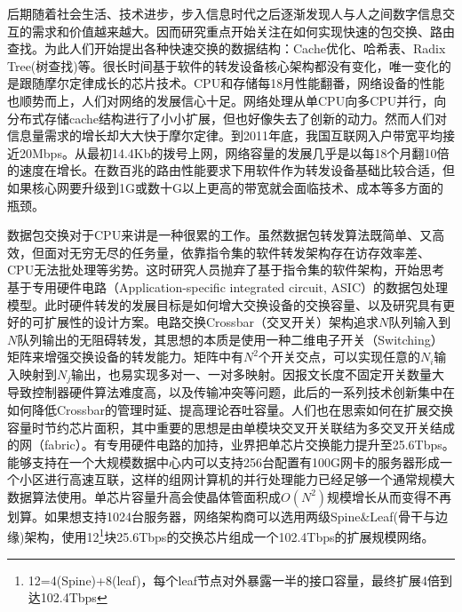 后期随着社会生活、技术进步，步入信息时代之后逐渐发现人与人之间数字信息交互的需求和价值越来越大。因而研究重点开始关注在如何实现快速的包交换、路由查找。为此人们开始提出各种快速交换的数据结构：Cache优化、哈希表、Radix Tree(树查找)等。很长时间基于软件的转发设备核心架构都没有变化，唯一变化的是跟随摩尔定律成长的芯片技术。CPU和存储每18月性能翻番，网络设备的性能也顺势而上，人们对网络的发展信心十足。网络处理从单CPU向多CPU并行，向分布式存储cache结构进行了小小扩展，但也好像失去了创新的动力。然而人们对信息量需求的增长却大大快于摩尔定律。到2011年底，我国互联网入户带宽平均接近20Mbps。从最初14.4Kb的拨号上网，网络容量的发展几乎是以每18个月翻10倍的速度在增长。在数百兆的路由性能要求下用软件作为转发设备基础比较合适，但如果核心网要升级到1G或数十G以上更高的带宽就会面临技术、成本等多方面的瓶颈。






数据包交换对于CPU来讲是一种很累的工作。虽然数据包转发算法既简单、又高效，但面对无穷无尽的任务量，依靠指令集的软件转发架构存在访存效率差、CPU无法批处理等劣势。这时研究人员抛弃了基于指令集的软件架构，开始思考基于专用硬件电路（Application-specific integrated circuit, ASIC）的数据包处理模型。此时硬件转发的发展目标是如何增大交换设备的交换容量、以及研究具有更好的可扩展性的设计方案。电路交换Crossbar（交叉开关）架构追求$N$队列输入到$N$队列输出的无阻碍转发，其思想的本质是使用一种二维电子开关（Switching）矩阵来增强交换设备的转发能力。矩阵中有$N^2$个开关交点，可以实现任意的$N_i$输入映射到$N_j$输出，也易实现多对一、一对多映射。因报文长度不固定开关数量大导致控制器硬件算法难度高，以及传输冲突等问题，此后的一系列技术创新集中在如何降低Crossbar的管理时延、提高理论吞吐容量。人们也在思索如何在扩展交换容量时节约芯片面积，其中重要的思想是由单模块交叉开关联结为多交叉开关结成的网（fabric）。有专用硬件电路的加持，业界把单芯片交换能力提升至25.6Tbps。能够支持在一个大规模数据中心内可以支持256台配置有100G网卡的服务器形成一个小区进行高速互联，这样的组网计算机的并行处理能力已经足够一个通常规模大数据算法使用。单芯片容量升高会使晶体管面积成$O(N^2)$规模增长从而变得不再划算。如果想支持1024台服务器，网络架构商可以选用两级Spine\&Leaf(骨干与边缘)架构，使用12\footnote{12=4(Spine)+8(leaf)，每个leaf节点对外暴露一半的接口容量，最终扩展4倍到达102.4Tbps}块25.6Tbps的交换芯片组成一个102.4Tbps的扩展规模网络。

